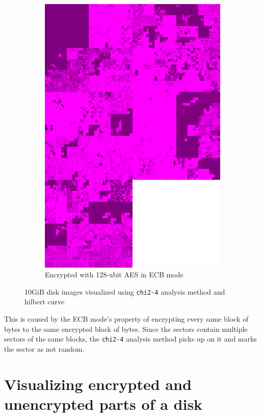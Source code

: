 \documentclass[
  digital, %
  oneside, %
  lof,     %
  lot,     %
]{fithesis4}
\begin{document}
\begin{figure}
\begin{subfigure}[t]{.45\textwidth}
        \includegraphics[width=\textwidth,interpolate=false]{figures/ubnt-test-aes-128-ecb-chi2-4-hilbert.png}
        \caption{Encrypted with 128-ubit AES in ECB mode}
        \label{fig:bad-enc-enc}
     \end{subfigure}
    \caption{10GiB disk images visualized using \texttt{chi2-4} analysis method and hilbert curve}
    \label{fig:bad-enc-fig}
\end{figure}

This is caused by the ECB mode's property of encrypting every same block of bytes to the same encrypted block of bytes.
Since the sectors contain multiple sectors of the same blocks, the \texttt{chi2-4} analysis method picks up on it and marks the sector as not random.

\section{Visualizing encrypted and unencrypted parts of a disk}
\end{document}
